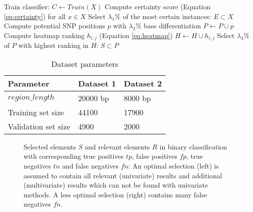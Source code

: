 \documentclass{article}
\begin{document}
\begin{algorithm}[t]
  \caption{$\mbox{SNP selection pipeline}$}
  \begin{algorithmic}[1]
    \STATE Train classifier: $C\leftarrow Train(X)$ 
    \STATE Compute certainty score (Equation \ref{eq:certainty}) for all $x\in X$ 
    \STATE Select $\lambda_{1} \%$ of the most certain instances: $E\subset X$
        \STATE Compute potential SNP positions $p$ with $\lambda_{2}\%$ base differentiation
        \STATE $P\leftarrow P\cup p$
            \STATE Compute heatmap ranking $h_{i,j}$ (Equation \ref{eq:heatmap})
            \STATE $H\leftarrow H\cup h_{i,j} $
        \ENDFOR
    \ENDFOR
    \STATE Select $\lambda_{3}\%$ of $P$ with highest ranking in $H$: $S\subset P$
  \end{algorithmic}
      \label{algo_summary}
\end{algorithm}
\begin{table}[h!]
 \caption{Dataset parameters}
  \centering
  \begin{tabular}{lll}
    \toprule
    Parameter     & Dataset 1     & Dataset 2 \\
    \midrule
    $region\_length$ & 20000 bp  & 8000 bp    \\
    Training set size     & 44100 & 17900     \\
    Validation set size     & 4900       & 2000  \\
    \bottomrule
  \end{tabular}
  \label{tab:table_configs}
\end{table}
\begin{figure*}[t!]
\centering

\caption{Selected elements $S$ and relevant elements $R$ in binary classification with corresponding true positives $tp$, false positives $fp$, true negatives $tn$ and false negatives $fn$: An optimal selection (left) is assumed to contain all relevant (univariate) results and additional (multivariate) results which can not be found with univariate methods. A less optimal selection (right) contains many false negatives $fn$.}
\label{fig:test}
\end{figure*}
\end{document}
